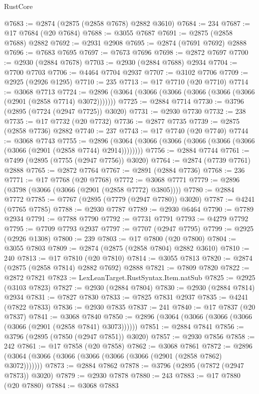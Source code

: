 \begin{lexlean}{RustCore}
\begin{coremodule}
@7683 := @2874 (@2875 (@2858 @7678) @2882 @3610)
@7684 := 234
@7687 := @17 @7684 (@20 @7684)
@7688 := @3055 @7687
@7691 := @2875 (@2858 @7688) @2882
@7692 := @2931 @2908
@7695 := @2874 (@7691 @7692) @2888
@7696 := @7683 @7695
@7697 := @7673 @7696
@7698 := @2872 @7697
@7700 := @2930 (@2884 @7678)
@7703 := @2930 (@2884 @7688) @2934
@7704 := @7700 @7703
@7706 := @4464 @7704 @2937
@7707 := @3102 @7706
@7709 := @2925 (@2926 @1295)
@7710 := 235
@7713 := @17 @7710 (@20 @7710)
@7714 := @3068 @7713
@7724 := @2896 (@3064 (@3066 (@3066 (@3066 (@3066 (@3066 (@2901 (@2858 @7714) @3072)))))))
@7725 := @2884 @7714
@7730 := @3796 (@2895 (@7724 (@2947 @7725)) @3020)
@7731 := @2930 @7730
@7732 := 238
@7735 := @17 @7732 (@20 @7732)
@7736 := @2877 @7735
@7739 := @2875 (@2858 @7736) @2882
@7740 := 237
@7743 := @17 @7740 (@20 @7740)
@7744 := @3068 @7743
@7755 := @2896 (@3064 (@3066 (@3066 (@3066 (@3066 (@3066 (@3066 (@2901 (@2858 @7744) @2914))))))))
@7756 := @2884 @7744
@7761 := @7499 (@2895 (@7755 (@2947 @7756)) @3020)
@7764 := @2874 (@7739 @7761) @2888
@7765 := @2872 @7764
@7767 := @2891 (@2884 @7736)
@7768 := 236
@7771 := @17 @7768 (@20 @7768)
@7772 := @3068 @7771
@7779 := @2896 (@3798 (@3066 (@3066 (@2901 (@2858 @7772) @3805))))
@7780 := @2884 @7772
@7785 := @7767 (@2895 (@7779 (@2947 @7780)) @3020)
@7787 := @4241 (@7765 @7785)
@7788 := @2930 @7787
@7789 := @2930 @6464
@7790 := @7789 @2934
@7791 := @7788 @7790
@7792 := @7731 @7791
@7793 := @4279 @7792
@7795 := @7709 @7793 @2937
@7797 := @7707 (@2947 @7795)
@7799 := @2925 (@2926 @1308)
@7800 := 239
@7803 := @17 @7800 (@20 @7800)
@7804 := @3055 @7803
@7809 := @2874 (@2875 (@2858 @7804) @2882 @3610)
@7810 := 240
@7813 := @17 @7810 (@20 @7810)
@7814 := @3055 @7813
@7820 := @2874 (@2875 (@2858 @7814) @2882 @7692) @2888
@7821 := @7809 @7820
@7822 := @2872 @7821
@7823 := LexLeanTarget.RustSyntax.Item.natSub
@7825 := @2925 (@3103 @7823)
@7827 := @2930 (@2884 @7804)
@7830 := @2930 (@2884 @7814) @2934
@7831 := @7827 @7830
@7833 := @7825 @7831 @2937
@7835 := @4241 (@7822 @7833)
@7836 := @2930 @7835
@7837 := 241
@7840 := @17 @7837 (@20 @7837)
@7841 := @3068 @7840
@7850 := @2896 (@3064 (@3066 (@3066 (@3066 (@3066 (@2901 (@2858 @7841) @3073))))))
@7851 := @2884 @7841
@7856 := @3796 (@2895 (@7850 (@2947 @7851)) @3020)
@7857 := @2930 @7856
@7858 := 242
@7861 := @17 @7858 (@20 @7858)
@7862 := @3068 @7861
@7872 := @2896 (@3064 (@3066 (@3066 (@3066 (@3066 (@3066 (@2901 (@2858 @7862) @3072)))))))
@7873 := @2884 @7862
@7878 := @3796 (@2895 (@7872 (@2947 @7873)) @3020)
@7879 := @2930 @7878
@7880 := 243
@7883 := @17 @7880 (@20 @7880)
@7884 := @3068 @7883

\end{coremodule}
\end{lexlean}
